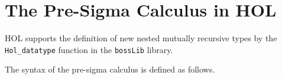 \documentclass[envcountsame,runningheads]{llncs}
\begin{document}


%
\section{The Pre-Sigma Calculus in HOL}
%
\label{presigmacalculus}

HOL supports the definition of new nested mutually recursive types
by the {\tt Hol\_datatype} function in the
{\tt bossLib} library.



The syntax
of the pre-sigma calculus
is defined as follows.
\end{document}
